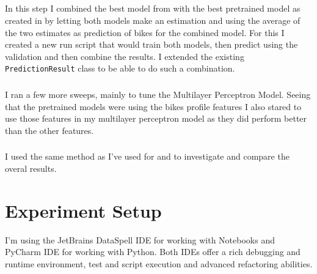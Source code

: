 \documentclass[a4paper]{article}
\begin{document}
    \subsection*{}
    \subsubsection*{}
    In this step I combined the best model from  with the best pretrained model as created in 
    by letting both models make an estimation and using the average of the two estimates as prediction of bikes for the combined model.
    For this I created a new run script that would train both models, then predict using the validation and then
    combine the results. I extended the existing \texttt{PredictionResult} class to be able to do such a combination.

    \subsubsection*{}
    I ran a few more sweeps, mainly to tune the Multilayer Perceptron Model. Seeing that the pretrained
    models were using the bikes profile features I also stared to use those features in my multilayer perceptron model as
    they did perform better than the other features.

    \subsubsection*{}
    I used the same method as I've used for  and  to investigate and compare the
    overal results.



    \section{Experiment Setup}\label{sec:experiment-setup}
    I'm using the JetBrains DataSpell IDE for working with Notebooks and PyCharm IDE for working with Python. Both IDEs offer
    a rich debugging and runtime environment, test and script execution and advanced refactoring abilities.

    \subsection*{}
\end{document}
